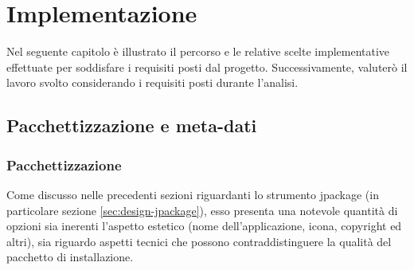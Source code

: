 
\chapter{Implementazione}

Nel seguente capitolo è illustrato il percorso e le relative scelte implementative effettuate per soddisfare i requisiti posti dal progetto. Successivamente, valuterò il lavoro svolto considerando i requisiti posti durante l'analisi.

\section{Pacchettizzazione e meta-dati}

\subsection{Pacchettizzazione}

Come discusso nelle precedenti sezioni riguardanti lo strumento jpackage (in particolare sezione \ref{sec:design-jpackage}), esso presenta una notevole quantità di opzioni sia inerenti l'aspetto estetico (nome dell'applicazione, icona, copyright ed altri), sia riguardo aspetti tecnici che possono contraddistinguere la qualità del pacchetto di installazione. 

